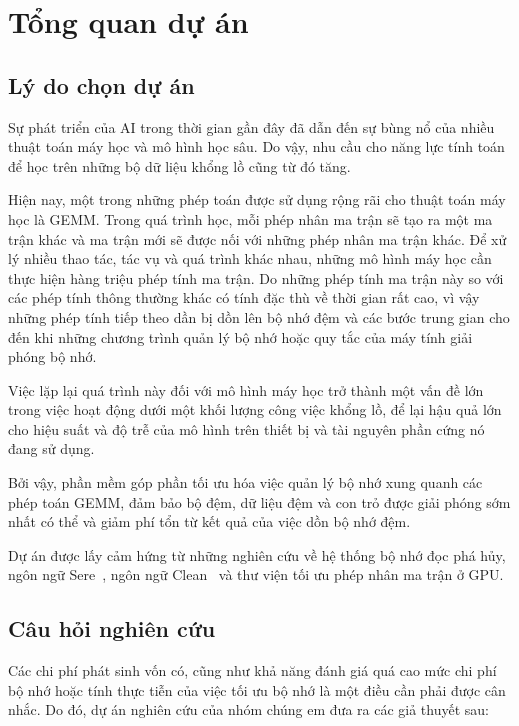 \documentclass[a4paper]{article}
\begin{document}
	\section{Tổng quan dự án}
	\label{sec:overview}
	
	\subsection{Lý do chọn dự án}
	
	Sự phát triển của AI trong thời gian gần đây đã dẫn đến sự bùng nổ của nhiều thuật toán máy học và mô hình học sâu. Do vậy, nhu cầu cho năng lực tính toán để học trên những bộ dữ liệu khổng lồ cũng từ đó tăng.
	
	Hiện nay, một trong những phép toán được sử dụng rộng rãi cho thuật toán máy học là GEMM. Trong quá trình học, mỗi phép nhân ma trận sẽ tạo ra một ma trận khác và ma trận mới sẽ được nối với những phép nhân ma trận khác. Để xử lý nhiều thao tác, tác vụ và quá trình khác nhau, những mô hình máy học cần thực hiện hàng triệu phép tính ma trận. Do những phép tính ma trận này so với các phép tính thông thường khác có tính đặc thù về thời gian rất cao, vì vậy những phép tính tiếp theo dần bị dồn lên bộ nhớ đệm và các bước trung gian cho đến khi những chương trình quản lý bộ nhớ hoặc quy tắc của máy tính giải phóng bộ nhớ.
	
	Việc lặp lại quá trình này đối với mô hình máy học trở thành một vấn đề lớn trong việc hoạt động dưới một khối lượng công việc khổng lồ, để lại hậu quả lớn cho hiệu suất và độ trễ của mô hình trên thiết bị và tài nguyên phần cứng nó đang sử dụng.
	
	Bởi vậy, phần mềm góp phần tối ưu hóa việc quản lý bộ nhớ xung quanh các phép toán GEMM, đảm bảo bộ đệm, dữ liệu đệm và con trỏ được giải phóng sớm nhất có thể và giảm phí tổn từ kết quả của việc dồn bộ nhớ đệm.
	
	Dự án được lấy cảm hứng từ những nghiên cứu về hệ thống bộ nhớ đọc phá hủy, ngôn ngữ Sere~\cite{sere}, ngôn ngữ Clean~\cite{clean} và thư viện tối ưu phép nhân ma trận ở GPU.
	
	\subsection{Câu hỏi nghiên cứu}
	
	Các chi phí phát sinh vốn có, cũng như khả năng đánh giá quá cao mức chi phí bộ nhớ hoặc tính thực tiễn của việc tối ưu bộ nhớ là một điều cần phải được cân nhắc. Do đó, dự án nghiên cứu của nhóm chúng em đưa ra các giả thuyết sau:
	
\end{document}
